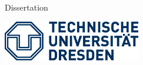 
\begin{titlepage}

\begin{addmargin}[-1cm]{-3cm}
\begin{center}
\large

\hfill
\vfill

\begingroup
\color{Maroon}\spacedallcaps{\myTitle} \\ \bigskip %
\endgroup
\spacedlowsmallcaps{\mySubtitle} \\ \medskip %

\Large{Dissertation} \\ \medskip

\vfill

%
\includegraphics[width=6cm]{figures/tud_logo.eps}
\\ \medskip %

\myName \\ %

\vfill

\end{center}
\end{addmargin}

\end{titlepage}